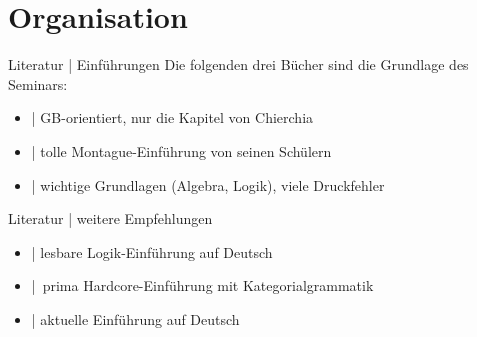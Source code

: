 
\section{Organisation}

\begin{frame}
  {Literatur | Einführungen}
  \onslide<+->
  \onslide<+->
  Die folgenden drei Bücher sind die Grundlage des Seminars:\\
  \Zeile
  \begin{itemize}[<+->]
    \item \alert{\citet{ChierchiaMcconnellginet2000}} | GB-orientiert, nur die Kapitel von Chierchia
    \item \alert{\citet{DowtyEa1981}} | tolle Montague-Einführung von seinen Schülern
    \item \alert{\citet{ParteeEa1990}} | wichtige Grundlagen (Algebra, Logik), viele Druckfehler
  \end{itemize}
\end{frame}

\begin{frame}
  {Literatur | weitere Empfehlungen}
  \onslide<+->
  \begin{itemize}[<+->]
    \item \alert{\citet{Bucher1998}} | lesbare Logik-Einführung auf Deutsch
    \item \alert{\citet{Carpenter1997}} | prima Hardcore-Einführung mit Kategorialgrammatik
    \item \alert{\citet{Gutzmann2019}} | aktuelle Einführung auf Deutsch
  \end{itemize}
\end{frame}


